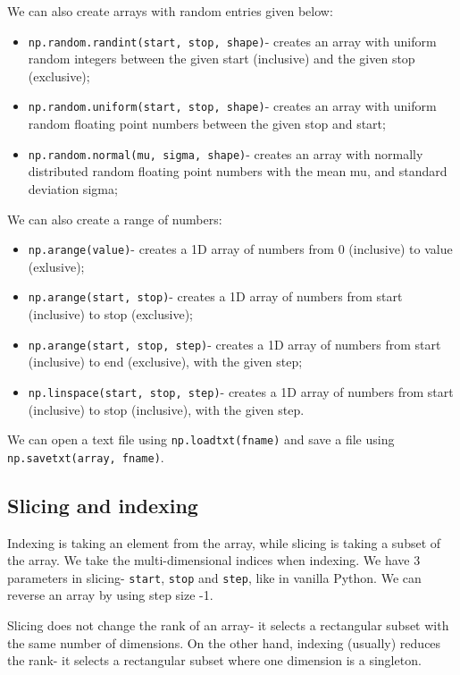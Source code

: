 \documentclass[a4paper, openany]{memoir}
\begin{document}
    We can also create arrays with random entries given below:
    \begin{itemize}
        \item \texttt{np.random.randint(start, stop, shape)}- creates an array with uniform random integers between the given start (inclusive) and the given stop (exclusive);
        \item \texttt{np.random.uniform(start, stop, shape)}- creates an array with uniform random floating point numbers between the given stop and start;
        \item \texttt{np.random.normal(mu, sigma, shape)}- creates an array with normally distributed random floating point numbers with the mean mu, and standard deviation sigma;
    \end{itemize}
    We can also create a range of numbers:
    \begin{itemize}
        \item \texttt{np.arange(value)}- creates a 1D array of numbers from 0 (inclusive) to value (exlusive);
        \item \texttt{np.arange(start, stop)}- creates a 1D array of numbers from start (inclusive) to stop (exclusive);
        \item \texttt{np.arange(start, stop, step)}- creates a 1D array of numbers from start (inclusive) to end (exclusive), with the given step;
        \item \texttt{np.linspace(start, stop, step)}- creates a 1D array of numbers from start (inclusive) to stop (inclusive), with the given step.
    \end{itemize}

    We can open a text file using \texttt{np.loadtxt(fname)} and save a file using \texttt{np.savetxt(array, fname)}.

    \subsection{Slicing and indexing}
    Indexing is taking an element from the array, while slicing is taking a subset of the array. We take the multi-dimensional indices when indexing. We have 3 parameters in slicing- \texttt{start}, \texttt{stop} and \texttt{step}, like in vanilla Python. We can reverse an array by using step size -1.

    Slicing does not change the rank of an array- it selects a rectangular subset with the same number of dimensions. On the other hand, indexing (usually) reduces the rank- it selects a rectangular subset where one dimension is a singleton.
\end{document}
